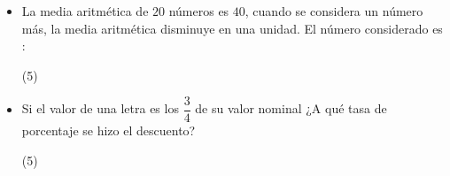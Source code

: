 \documentclass[10pt, twocolumn, landscape, a4paper]{article}
\begin{document}
\begin{itemize}
{\begin{tasks}(5)
\end{tasks}
}
\item{La media aritmética de $20$ números es $40$, cuando se considera un número más, la media aritmética disminuye en una unidad. El número considerado es :
\begin{tasks}(5)
\end{tasks}
}
\item{Si el valor de una letra es los $\dfrac{3}{4}$ de su valor nominal ¿A qué tasa de porcentaje se hizo el descuento?
\begin{tasks}(5)
\end{tasks}
}
\end{itemize}
\end{document}
